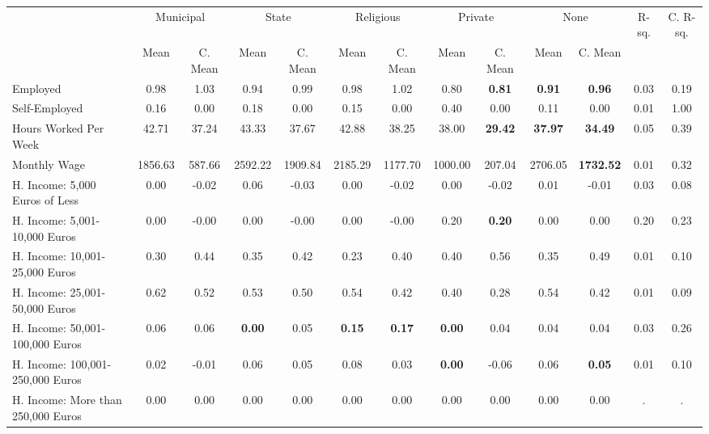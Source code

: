 \begin{tabular}{l c c c c c c c c c c c c}
\toprule
& \multicolumn{2}{c}{Municipal} & \multicolumn{2}{c}{State} & \multicolumn{2}{c}{Religious} & \multicolumn{2}{c}{Private} & \multicolumn{2}{c}{None} & R-sq. & C. R-sq. \\
& \scriptsize Mean & \scriptsize C. Mean & \scriptsize Mean & \scriptsize C. Mean & \scriptsize Mean & \scriptsize C. Mean & \scriptsize Mean & \scriptsize C. Mean & \scriptsize Mean & \scriptsize C. Mean & & \\
\midrule
Employed &      0.98 & 1.03 &      0.94 & 0.99 &      0.98 & 1.02 &      0.80 & \textbf{     0.81} & \textbf{     0.91} & \textbf{     0.96} &      0.03 &      0.19 \\
Self-Employed &      0.16 & 0.00 &      0.18 & 0.00 &      0.15 & 0.00 &      0.40 & 0.00 &      0.11 & 0.00 &      0.01 &      1.00 \\
Hours Worked Per Week &     42.71 & 37.24 &     43.33 & 37.67 &     42.88 & 38.25 &     38.00 & \textbf{    29.42} & \textbf{    37.97} & \textbf{    34.49} &      0.05 &      0.39 \\
Monthly Wage &   1856.63 & 587.66 &   2592.22 & 1909.84 &   2185.29 & 1177.70 &   1000.00 & 207.04 &   2706.05 & \textbf{  1732.52} &      0.01 &      0.32 \\
H. Income: 5,000 Euros of Less &      0.00 & -0.02 &      0.06 & -0.03 &      0.00 & -0.02 &      0.00 & -0.02 &      0.01 & -0.01 &      0.03 &      0.08 \\
H. Income: 5,001-10,000 Euros &      0.00 & -0.00 &      0.00 & -0.00 &      0.00 & -0.00 &      0.20 & \textbf{     0.20} &      0.00 & 0.00 &      0.20 &      0.23 \\
H. Income: 10,001-25,000 Euros &      0.30 & 0.44 &      0.35 & 0.42 &      0.23 & 0.40 &      0.40 & 0.56 &      0.35 & 0.49 &      0.01 &      0.10 \\
H. Income: 25,001-50,000 Euros &      0.62 & 0.52 &      0.53 & 0.50 &      0.54 & 0.42 &      0.40 & 0.28 &      0.54 & 0.42 &      0.01 &      0.09 \\
H. Income: 50,001-100,000 Euros &      0.06 & 0.06 & \textbf{     0.00} & 0.05 & \textbf{     0.15} & \textbf{     0.17} & \textbf{     0.00} & 0.04 &      0.04 & 0.04 &      0.03 &      0.26 \\
H. Income: 100,001-250,000 Euros &      0.02 & -0.01 &      0.06 & 0.05 &      0.08 & 0.03 & \textbf{     0.00} & -0.06 &      0.06 & \textbf{     0.05} &      0.01 &      0.10 \\
H. Income: More than 250,000 Euros &      0.00 & 0.00 &      0.00 & 0.00 &      0.00 & 0.00 &      0.00 & 0.00 &      0.00 & 0.00 &         . &         . \\
\bottomrule
\end{tabular}

